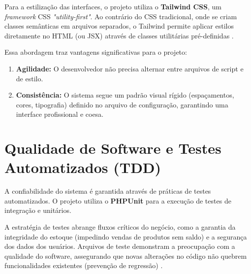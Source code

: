 Para a estilização das interfaces, o projeto utiliza o \textbf{Tailwind CSS}, um \textit{framework} CSS \textit{"utility-first"}. Ao contrário do CSS tradicional, onde se criam classes semânticas em arquivos separados, o Tailwind permite aplicar estilos diretamente no HTML (ou JSX) através de classes utilitárias pré-definidas \cite{tailwind2024}.

Essa abordagem traz vantagens significativas para o projeto:
\begin{enumerate}
    \item \textbf{Agilidade:} O desenvolvedor não precisa alternar entre arquivos de script e de estilo.
    \item \textbf{Consistência:} O sistema segue um padrão visual rígido (espaçamentos, cores, tipografia) definido no arquivo de configuração, garantindo uma interface profissional e coesa.
\end{enumerate}

\section{Qualidade de Software e Testes Automatizados (TDD)}
\label{sec:tdd}

A confiabilidade do sistema é garantida através de práticas de testes automatizados. O projeto utiliza o \textbf{PHPUnit} para a execução de testes de integração e unitários.

A estratégia de testes abrange fluxos críticos do negócio, como a garantia da integridade do estoque (impedindo vendas de produtos sem saldo) e a segurança dos dados dos usuários. Arquivos de teste demonstram a preocupação com a qualidade do software, assegurando que novas alterações no código não quebrem funcionalidades existentes (prevenção de regressão) \cite{beck2003}.